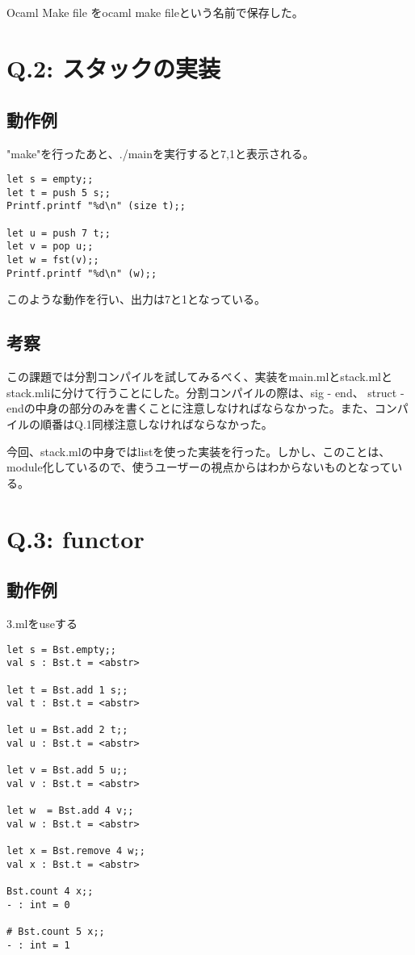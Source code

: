 \documentclass[uplatex,12pt]{jsarticle}
\begin{document}
\subsection{}
Ocaml Make file をocaml make fileという名前で保存した。





\section{Q.2: スタックの実装}
\subsection{動作例}
"make"を行ったあと、./mainを実行すると7,1と表示される。

\begin{lstlisting}[caption=main.mlの中身の一部]
let s = empty;;
let t = push 5 s;;
Printf.printf "%d\n" (size t);;

let u = push 7 t;;
let v = pop u;;
let w = fst(v);;
Printf.printf "%d\n" (w);;
\end{lstlisting}

このような動作を行い、出力は7と1となっている。

\subsection{考察}
この課題では分割コンパイルを試してみるべく、実装をmain.mlとstack.mlとstack.mliに分けて行うことにした。分割コンパイルの際は、sig - end、 struct - endの中身の部分のみを書くことに注意しなければならなかった。また、コンパイルの順番はQ.1同様注意しなければならなかった。

今回、stack.mlの中身ではlistを使った実装を行った。しかし、このことは、module化しているので、使うユーザーの視点からはわからないものとなっている。

\section{Q.3: functor}
\subsection{動作例}
3.mlをuseする

\begin{lstlisting}[caption=動作例]
let s = Bst.empty;;
val s : Bst.t = <abstr>

let t = Bst.add 1 s;;
val t : Bst.t = <abstr>

let u = Bst.add 2 t;;
val u : Bst.t = <abstr>

let v = Bst.add 5 u;;
val v : Bst.t = <abstr>

let w  = Bst.add 4 v;;
val w : Bst.t = <abstr>

let x = Bst.remove 4 w;;
val x : Bst.t = <abstr>

Bst.count 4 x;;
- : int = 0

# Bst.count 5 x;;
- : int = 1
\end{lstlisting}
\end{document}
